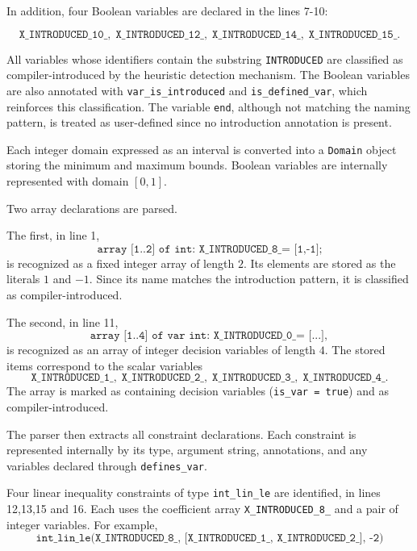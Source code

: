 \documentclass[../../main]{subfiles}
\begin{document}
In addition, four Boolean variables are declared in the lines 7-10:

\[
\texttt{X\_INTRODUCED\_10\_},\;
\texttt{X\_INTRODUCED\_12\_},\;
\texttt{X\_INTRODUCED\_14\_},\;
\texttt{X\_INTRODUCED\_15\_}.
\]

All variables whose identifiers contain the substring \texttt{INTRODUCED} are classified as compiler-introduced by the heuristic detection mechanism. The Boolean variables are also annotated with \texttt{var\_is\_introduced} and \texttt{is\_defined\_var}, which reinforces this classification. The variable \texttt{end}, although not matching the naming pattern, is treated as user-defined since no introduction annotation is present.

Each integer domain expressed as an interval is converted into a \texttt{Domain} object storing the minimum and maximum bounds. Boolean variables are internally represented with domain $[0,1]$.

Two array declarations are parsed.

The first, in line 1,
\[
\texttt{array [1..2] of int: X\_INTRODUCED\_8\_ = [1,-1];}
\]
is recognized as a fixed integer array of length $2$. Its elements are stored as the literals $1$ and $-1$. Since its name matches the introduction pattern, it is classified as compiler-introduced.

The second, in line 11,
\[
\texttt{array [1..4] of var int: X\_INTRODUCED\_0\_ = [...]},
\]
is recognized as an array of integer decision variables of length $4$. The stored items correspond to the scalar variables
\[
\texttt{X\_INTRODUCED\_1\_},\;
\texttt{X\_INTRODUCED\_2\_},\;
\texttt{X\_INTRODUCED\_3\_},\;
\texttt{X\_INTRODUCED\_4\_}.
\]
The array is marked as containing decision variables (\texttt{is\_var = true}) and as compiler-introduced.

The parser then extracts all constraint declarations. Each constraint is represented internally by its type, argument string, annotations, and any variables declared through \texttt{defines\_var}.

Four linear inequality constraints of type \texttt{int\_lin\_le} are identified, in lines 12,13,15 and 16. Each uses the coefficient array \texttt{X\_INTRODUCED\_8\_} and a pair of integer variables. For example,
\[
\texttt{int\_lin\_le(X\_INTRODUCED\_8\_, [X\_INTRODUCED\_1\_, X\_INTRODUCED\_2\_], -2)}
\]
\end{document}
